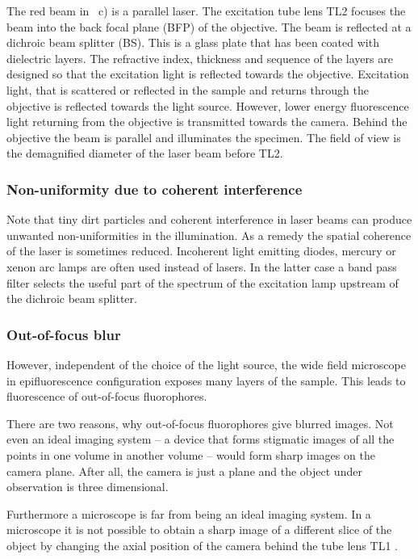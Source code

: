 The red beam in ~c) is a parallel
laser. The excitation tube lens TL2 focuses the beam into the back
focal plane (BFP) of the objective. The beam is reflected at a
dichroic beam splitter (BS). This is a glass plate that has been
coated with dielectric layers. The refractive index, thickness and
sequence of the layers are designed so that the excitation light is
reflected towards the objective. Excitation light, that is scattered
or reflected in the sample and returns through the objective is
reflected towards the light source. However, lower energy fluorescence
light returning from the objective is transmitted towards the
camera. Behind the objective the beam is parallel and illuminates the
specimen. The field of view is the demagnified diameter of the laser
beam before TL2.
\subsubsection*{Non-uniformity due to coherent interference}
Note that tiny dirt particles and coherent interference in laser beams
can produce unwanted non-uniformities in the illumination. As a remedy
the spatial coherence of the laser is sometimes reduced.  Incoherent
light emitting diodes, mercury or xenon arc lamps are often used
instead of lasers. In the latter case a band pass filter selects the
useful part of the spectrum of the excitation lamp upstream of the
dichroic beam splitter.

\subsubsection{Out-of-focus blur}
However, independent of the choice of the light source, the wide field
microscope in epifluorescence configuration exposes many layers of the
sample. This leads to fluorescence of out-of-focus fluorophores.

There are two reasons, why out-of-focus fluorophores give blurred
images. Not even an ideal imaging system -- a device that forms
stigmatic images of all the points in one volume in another volume --
would form sharp images on the camera plane. After all, the camera is
just a plane and the object under observation is three dimensional.

Furthermore a microscope is far from being an ideal imaging system. In
a microscope it is not possible to obtain a sharp image of a different
slice of the object by changing the axial position of the camera
behind the tube lens TL1 \citep{Botcherby2007,Botcherby2008a}.

